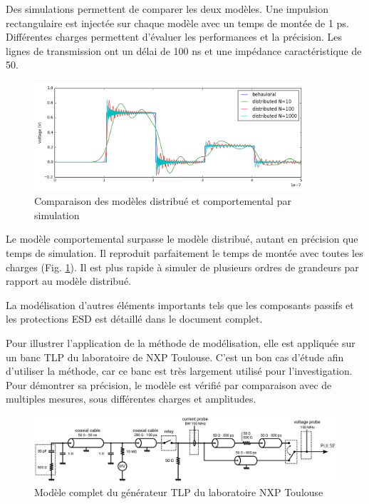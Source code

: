 Des simulations permettent de comparer les deux modèles.
Une impulsion rectangulaire est injectée sur chaque modèle avec un temps de montée de 1 ps.
Différentes charges permettent d'évaluer les performances et la précision.
Les lignes de transmission ont un délai de 100 ns et une impédance caractéristique de 50\textOmega{}.

\begin{figure}[!h]
  \centering
  \includegraphics[width=0.9\textwidth]{src/1/figures/tline_comparison.png}
  \caption{Comparaison des modèles distribué et comportemental par simulation}
  \label{fig:lines-simulations}
\end{figure}

Le modèle comportemental surpasse le modèle distribué, autant en précision que temps de simulation.
Il reproduit parfaitement le temps de montée avec toutes les charges (Fig. \ref{fig:lines-simulations}).
Il est plus rapide à simuler de plusieurs ordres de grandeurs par rapport au modèle distribué.

La modélisation d'autres éléments importants tels que les composants passifs et les protections ESD est détaillé dans le document complet.

Pour illustrer l'application de la méthode de modélisation, elle est appliquée sur un banc TLP du laboratoire de NXP Toulouse.
C'est un bon cas d'étude afin d'utiliser la méthode, car ce banc est très largement utilisé pour l'investigation.
Pour démontrer sa précision, le modèle est vérifié par comparaison avec de multiples mesures, sous différentes charges et amplitudes.

\begin{figure}[!h]
  \centering
  \includegraphics[width=\textwidth]{src/1/figures/complete_nxp_tlp_model.pdf}
  \caption{Modèle complet du générateur TLP du laboratoire NXP Toulouse}
  \label{fig:complete-tlp-model}
\end{figure}

